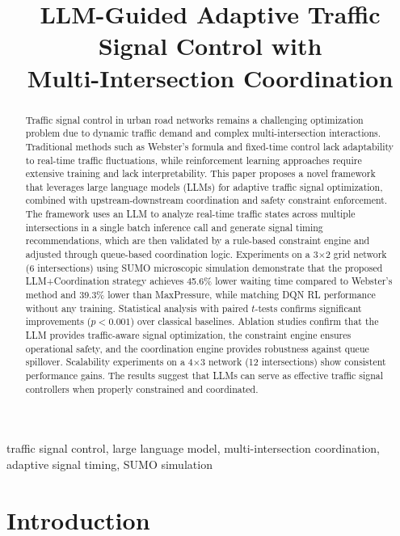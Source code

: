 \documentclass[conference]{IEEEtran}
\title{LLM-Guided Adaptive Traffic Signal Control with\\Multi-Intersection Coordination}
\author{
\IEEEauthorblockN{Yihao Tang}
\IEEEauthorblockA{School of Intelligent Systems Engineering\\
Sun Yat-sen University\\
Guangzhou, China\\
tangyh@mail2.sysu.edu.cn}
}
\begin{document}
\maketitle

\begin{abstract}
Traffic signal control in urban road networks remains a challenging optimization problem due to dynamic traffic demand and complex multi-intersection interactions. Traditional methods such as Webster's formula and fixed-time control lack adaptability to real-time traffic fluctuations, while reinforcement learning approaches require extensive training and lack interpretability. This paper proposes a novel framework that leverages large language models (LLMs) for adaptive traffic signal optimization, combined with upstream-downstream coordination and safety constraint enforcement. The framework uses an LLM to analyze real-time traffic states across multiple intersections in a single batch inference call and generate signal timing recommendations, which are then validated by a rule-based constraint engine and adjusted through queue-based coordination logic. Experiments on a 3$\times$2 grid network (6 intersections) using SUMO microscopic simulation demonstrate that the proposed LLM+Coordination strategy achieves 45.6\% lower waiting time compared to Webster's method and 39.3\% lower than MaxPressure, while matching DQN RL performance without any training. Statistical analysis with paired $t$-tests confirms significant improvements ($p<0.001$) over classical baselines. Ablation studies confirm that the LLM provides traffic-aware signal optimization, the constraint engine ensures operational safety, and the coordination engine provides robustness against queue spillover. Scalability experiments on a 4$\times$3 network (12 intersections) show consistent performance gains. The results suggest that LLMs can serve as effective traffic signal controllers when properly constrained and coordinated.
\end{abstract}

\begin{IEEEkeywords}
traffic signal control, large language model, multi-intersection coordination, adaptive signal timing, SUMO simulation
\end{IEEEkeywords}


\section{Introduction}
\label{sec:intro}
\end{document}
